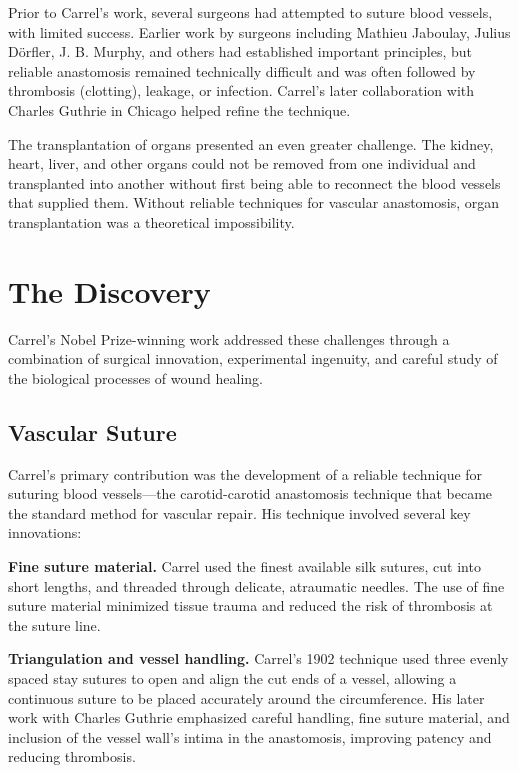 Prior to Carrel's work, several surgeons had attempted to suture blood vessels, with limited success. Earlier work by surgeons including Mathieu Jaboulay, Julius Dörfler, J. B. Murphy, and others had established important principles, but reliable anastomosis remained technically difficult and was often followed by thrombosis (clotting), leakage, or infection. Carrel's later collaboration with Charles Guthrie in Chicago helped refine the technique.\cite{carrel-history}

The transplantation of organs presented an even greater challenge. The kidney, heart, liver, and other organs could not be removed from one individual and transplanted into another without first being able to reconnect the blood vessels that supplied them. Without reliable techniques for vascular anastomosis, organ transplantation was a theoretical impossibility.

\section{The Discovery}

Carrel's Nobel Prize-winning work addressed these challenges through a combination of surgical innovation, experimental ingenuity, and careful study of the biological processes of wound healing.

\subsection{Vascular Suture}

Carrel's primary contribution was the development of a reliable technique for suturing blood vessels---the carotid-carotid anastomosis technique that became the standard method for vascular repair. His technique involved several key innovations:

\textbf{Fine suture material.} Carrel used the finest available silk sutures, cut into short lengths, and threaded through delicate, atraumatic needles. The use of fine suture material minimized tissue trauma and reduced the risk of thrombosis at the suture line.

\textbf{Triangulation and vessel handling.} Carrel's 1902 technique used three evenly spaced stay sutures to open and align the cut ends of a vessel, allowing a continuous suture to be placed accurately around the circumference. His later work with Charles Guthrie emphasized careful handling, fine suture material, and inclusion of the vessel wall's intima in the anastomosis, improving patency and reducing thrombosis.\cite{carrel-history}

